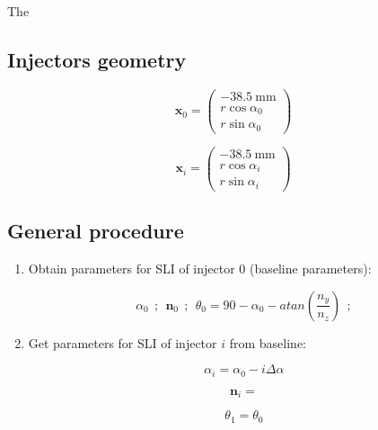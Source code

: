 The 

\subsection{Injectors geometry}

\begin{equation}
\boldsymbol{x}_0 =  \begin{pmatrix} - 38.5 ~\mathrm{mm} \\ r \cos \alpha_0 \\ r \sin \alpha_0 \end{pmatrix}
\end{equation}

\begin{equation}
\boldsymbol{x}_i =  \begin{pmatrix} - 38.5 ~\mathrm{mm} \\ r \cos \alpha_i \\ r \sin \alpha_i \end{pmatrix}
\end{equation}


\subsection{General procedure}

\begin{enumerate}

	\item Obtain parameters for SLI of injector 0 (baseline parameters):
	
	\begin{equation}
	\alpha_0  ~~ ; ~~ \boldsymbol{n}_0 ~~ ; ~~ \theta_0 = 90 - \alpha_0 - atan \left( \frac{n_y}{n_z} \right) ~~ ; 
	\end{equation}

	\item Get parameters for SLI of injector $i$ from baseline:
	
	\begin{equation}
	\alpha_i = \alpha_0 - i \Delta \alpha 
	\end{equation}
	
	\begin{equation}
	\boldsymbol{n}_i = 
	\end{equation}
	
	\begin{equation}
	\theta_1 = \theta_0
	\end{equation}
	

\end{enumerate}

